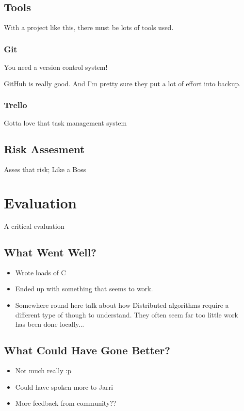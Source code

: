 \documentclass[12pt]{report}
\begin{document}
\section{Tools}
With a project like this, there must be lots of tools used. 

\subsection{Git}
You need a version control system!

GitHub is really good. And I'm pretty sure they put a lot of effort into backup.

\subsection{Trello}
Gotta love that task management system

\section{Risk Assesment}
Asses that risk; Like a Boss

\chapter{Evaluation}
A critical evaluation

\section{What Went Well?}

\begin{itemize}
\item Wrote loads of C
\item Ended up with something that seems to work.
\item Somewhere round here talk about how Distributed algorithms require a different type of though to understand. They often seem far too little work has been done locally...
\end{itemize}

\section{What Could Have Gone Better?}

\begin{itemize}
\item Not much really :p
\item Could have spoken more to Jarri
\item More feedback from community??
\end{itemize}
\end{document}
